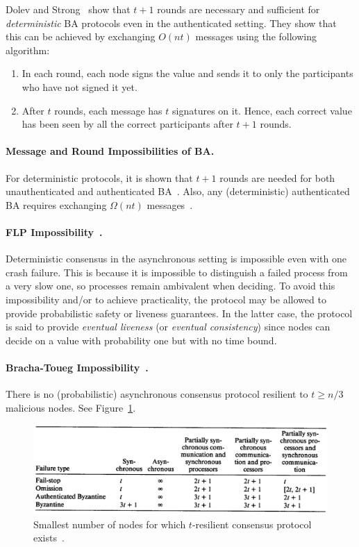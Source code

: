 \documentclass[11pt]{article}
\theoremstyle{mytheoremstyle}
\begin{document}
Dolev and Strong~\cite{Dolev:Strong:83} show that $t + 1$ rounds are necessary and sufficient for \emph{deterministic} BA protocols even in the authenticated setting. They show that this can be achieved by exchanging $O(nt)$ messages using the following algorithm:

\begin{enumerate}
	\item In each round, each node signs the value and sends it to only the participants who have not signed it yet.
	\item After $t$ rounds, each message has $t$ signatures on it. Hence, each correct value has been seen by all the correct participants after $t+1$ rounds.
\end{enumerate}

\paragraph{Message and Round Impossibilities of BA.}
For deterministic protocols, it is shown that $t+1$ rounds are needed for both unauthenticated and authenticated BA~\cite{FischerLynch81,Dolev:1982:STOC}. Also, any (deterministic) authenticated BA requires exchanging $\Omega(nt)$ messages~\cite{dolev:reischuk:82}.

\paragraph{FLP Impossibility~\cite{FLP}.} Deterministic consensus in the asynchronous setting is impossible even with one crash failure. This is because it is impossible to distinguish a failed process from a very slow one, so processes remain ambivalent when deciding. To avoid this impossibility and/or to achieve practicality, the protocol may be allowed to provide probabilistic safety or liveness guarantees. In the latter case, the protocol is said to provide \emph{eventual liveness} (or \emph{eventual consistency}) since nodes can decide on a value with probability one but with no time bound.

\paragraph{Bracha-Toueg Impossibility~\cite{Bracha:Toueg:1983}.} There is no (probabilistic) asynchronous consensus protocol resilient to $t \geq n/3$ malicious nodes. See Figure~\ref{fig:bounds}.

\begin{figure}
	\centering
	\includegraphics[width=0.9\linewidth]{bounds}
	\caption{Smallest number of nodes for which $t$-resilient consensus protocol exists~\cite{dwork:1988:cpp}.}
	\label{fig:bounds}
\end{figure}
\end{document}
